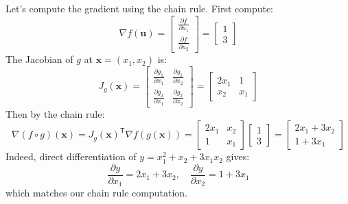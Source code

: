 \begin{notechapter}
Let's compute the gradient using the chain rule. First compute:
\[
\nabla f(\mathbf{u}) = \begin{bmatrix} \frac{\partial f}{\partial u_1} \\ \frac{\partial f}{\partial u_2} \end{bmatrix} = \begin{bmatrix} 1 \\ 3 \end{bmatrix}
\]
The Jacobian of $g$ at $\mathbf{x} = (x_1, x_2)$ is:
\[
J_g(\mathbf{x}) = \begin{bmatrix} 
\frac{\partial g_1}{\partial x_1} & \frac{\partial g_1}{\partial x_2} \\
\frac{\partial g_2}{\partial x_1} & \frac{\partial g_2}{\partial x_2}
\end{bmatrix} = \begin{bmatrix} 
2x_1 & 1 \\
x_2 & x_1
\end{bmatrix}
\]
Then by the chain rule:
\[
\nabla (f \circ g)(\mathbf{x}) = J_g(\mathbf{x})^\mathsf{T} \nabla f(g(\mathbf{x})) =
\begin{bmatrix} 2x_1 & x_2 \\ 1 & x_1 \end{bmatrix}
\begin{bmatrix} 1 \\ 3 \end{bmatrix} =
\begin{bmatrix} 2x_1 + 3x_2 \\ 1 + 3x_1 \end{bmatrix}
\]
Indeed, direct differentiation of $y = x_1^2 + x_2 + 3x_1 x_2$ gives:
\[
\frac{\partial y}{\partial x_1} = 2x_1 + 3x_2, \quad \frac{\partial y}{\partial x_2} = 1 + 3x_1
\]
which matches our chain rule computation.


\end{notechapter}
